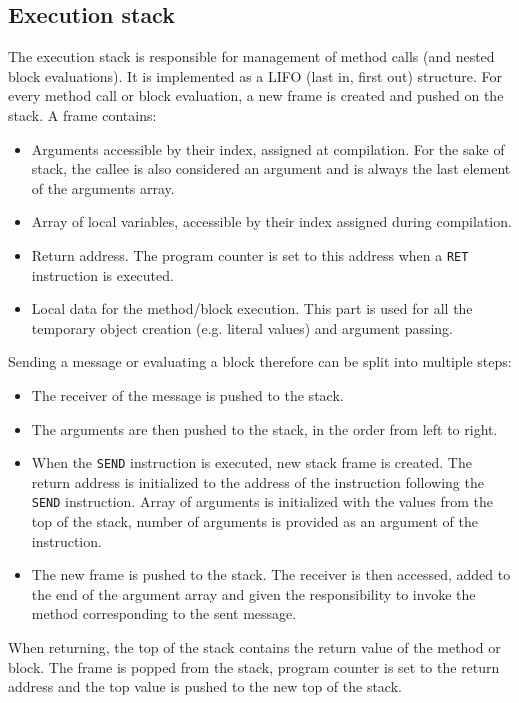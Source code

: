 \documentclass[thesis=M,english]{FITthesis}[2019/12/23]
\begin{document}
\subsection{Execution stack}
The execution stack is responsible for management of method calls (and nested block evaluations). It is implemented as a LIFO (last in, first out) structure.
For every method call or block evaluation, a new frame is created and pushed on the stack. A frame contains:
\begin{itemize}
	\item Arguments accessible by their index, assigned at compilation. For the sake of stack, the callee is also considered an argument and is always
		the last element of the arguments array.
	\item Array of local variables, accessible by their index assigned during compilation.
	\item Return address. The program counter is set to this address when a \texttt{RET} instruction is executed.
	\item Local data for the method/block execution. This part is used for all the temporary object creation (e.g. literal values) and argument passing.
\end{itemize}

Sending a message or evaluating a block therefore can be split into multiple steps:
\begin{itemize}
	\item The receiver of the message is pushed to the stack.
	\item The arguments are then pushed to the stack, in the order from left to right.
	\item When the \texttt{SEND} instruction is executed, new stack frame is created. The return address is initialized to the address of the instruction
		following the \texttt{SEND} instruction. Array of arguments is initialized with the values from the top of the stack, number of arguments is provided
		as an argument of the instruction.
	\item The new frame is pushed to the stack. The receiver is then accessed, added to the end of the argument array and given the responsibility to invoke
		the method corresponding to the sent message.
\end{itemize}

When returning, the top of the stack contains the return value of the method or block. The frame is popped from the stack, program counter is set to the return
address and the top value is pushed to the new top of the stack.
\end{document}

